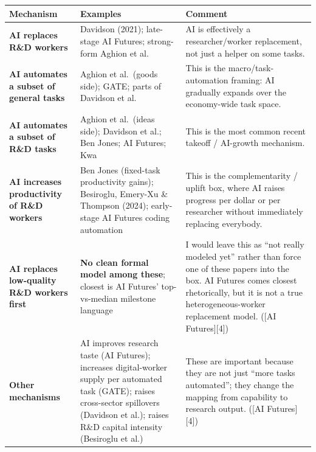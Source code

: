 \documentclass[
  11pt,
  letterpaper,
  DIV=11,
  numbers=noendperiod]{scrartcl}
\begin{document}
\begin{longtable}[]{@{}
  >{\raggedright\arraybackslash}p{}
  >{\raggedright\arraybackslash}p{}
  >{\raggedright\arraybackslash}p{}@{}}
\toprule\noalign{}
\begin{minipage}[b]{\linewidth}\raggedright
Mechanism
\end{minipage} & \begin{minipage}[b]{\linewidth}\raggedright
Examples
\end{minipage} & \begin{minipage}[b]{\linewidth}\raggedright
Comment
\end{minipage} \\
\midrule\noalign{}
\endhead
\bottomrule\noalign{}
\endlastfoot
\textbf{AI replaces R\&D workers} & Davidson (2021); late-stage AI
Futures; strong-form Aghion et al. & AI is effectively a
researcher/worker replacement, not just a helper on some tasks. \\
\textbf{AI automates a subset of general tasks} & Aghion et al.~(goods
side); GATE; parts of Davidson et al. & This is the
macro/task-automation framing: AI gradually expands over the
economy-wide task space. \\
\textbf{AI automates a subset of R\&D tasks} & Aghion et al.~(ideas
side); Davidson et al.; Ben Jones; AI Futures; Kwa & This is the most
common recent takeoff / AI-growth mechanism. \\
\textbf{AI increases productivity of R\&D workers} & Ben Jones
(fixed-task productivity gains); Besiroglu, Emery-Xu \& Thompson (2024);
early-stage AI Futures coding automation & This is the complementarity /
uplift box, where AI raises progress per dollar or per researcher
without immediately replacing everybody. \\
\textbf{AI replaces low-quality R\&D workers first} & \textbf{No clean
formal model among these}; closest is AI Futures' top-vs-median
milestone language & I would leave this as ``not really modeled yet''
rather than force one of these papers into the box. AI Futures comes
closest rhetorically, but it is not a true heterogeneous-worker
replacement model. ({[}AI Futures{]}{[}4{]}) \\
\textbf{Other mechanisms} & AI improves research taste (AI Futures);
increases digital-worker supply per automated task (GATE); raises
cross-sector spillovers (Davidson et al.); raises R\&D capital intensity
(Besiroglu et al.) & These are important because they are not just
``more tasks automated''; they change the mapping from capability to
research output. ({[}AI Futures{]}{[}4{]}) \\
\end{longtable}
\end{document}
